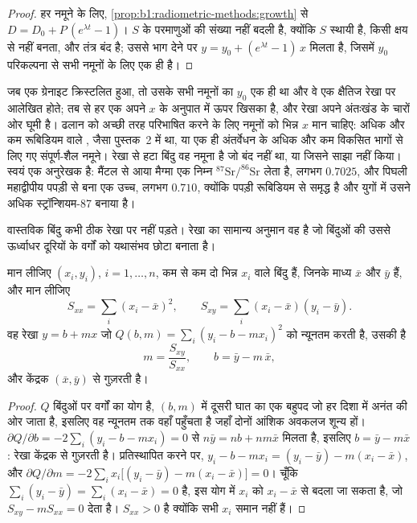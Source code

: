 \begin{proof}
हर नमूने के लिए, \cref{prop:b1:radiometric-methods:growth} से $D = D_0 + P\,(e^{\lambda t} - 1)$। $S$ के परमाणुओं की संख्या नहीं बदली है, क्योंकि $S$ स्थायी है, किसी क्षय से नहीं बनता, और तंत्र बंद है; उससे भाग देने पर $y = y_0 + (e^{\lambda t} - 1)\,x$ मिलता है, जिसमें $y_0$ परिकल्पना से सभी नमूनों के लिए एक ही है।
\end{proof}

जब एक ग्रेनाइट क्रिस्टलित हुआ, तो उसके सभी नमूनों का $y_0$ एक ही था और वे एक क्षैतिज रेखा पर आलेखित होते; तब से हर एक अपने $x$ के अनुपात में ऊपर खिसका है, और रेखा अपने अंतःखंड के चारों ओर घूमी है। ढलान को अच्छी तरह परिभाषित करने के लिए नमूनों को भिन्न $x$ मान चाहिए: अधिक और कम रूबिडियम वाले , जैसा पुस्तक~2 में था, या एक ही अंतर्वेधन के अधिक और कम विकसित भागों से लिए गए संपूर्ण-शैल नमूने। रेखा से हटा बिंदु वह नमूना है जो बंद नहीं था, या जिसने  साझा नहीं किया।  स्वयं एक अनुरेखक है: मैंटल से आया मैग्मा एक निम्न $^{87}\mathrm{Sr}/^{86}\mathrm{Sr}$ लेता है, लगभग $0.7025$, और पिघली महाद्वीपीय पपड़ी से बना एक उच्च, लगभग $0.710$, क्योंकि पपड़ी रूबिडियम से समृद्ध है और युगों में उसने अधिक स्ट्रॉन्शियम-87 बनाया है।

वास्तविक बिंदु कभी ठीक रेखा पर नहीं पड़ते। रेखा का सामान्य अनुमान वह है जो बिंदुओं की उससे ऊर्ध्वाधर दूरियों के वर्गों को यथासंभव छोटा बनाता है।

\begin{proposition}[न्यूनतम-वर्ग रेखा]\label{prop:b1:radiometric-methods:lsq}
मान लीजिए $(x_i, y_i)$, $i = 1, \dots, n$, कम से कम दो भिन्न $x_i$ वाले बिंदु हैं, जिनके माध्य $\bar x$ और $\bar y$ हैं, और मान लीजिए
\[
  S_{xx} = \sum_i (x_i - \bar x)^2, \qquad S_{xy} = \sum_i (x_i - \bar x)(y_i - \bar y).
\]
वह रेखा $y = b + m x$ जो $Q(b, m) = \sum_i (y_i - b - m x_i)^2$ को न्यूनतम करती है, उसकी है
\[
  m = \frac{S_{xy}}{S_{xx}}, \qquad b = \bar y - m\,\bar x ,
\]
और केंद्रक $(\bar x, \bar y)$ से गुज़रती है।
\end{proposition}

\begin{proof}
$Q$ बिंदुओं पर वर्गों का योग है, $(b, m)$ में दूसरी घात का एक बहुपद जो हर दिशा में अनंत की ओर जाता है, इसलिए वह न्यूनतम तक वहाँ पहुँचता है जहाँ दोनों आंशिक अवकलज शून्य हों। $\partial Q/\partial b = -2 \sum_i (y_i - b - m x_i) = 0$ से $n\bar y = n b + n m \bar x$ मिलता है, इसलिए $b = \bar y - m \bar x$: रेखा केंद्रक से गुज़रती है। प्रतिस्थापित करने पर, $y_i - b - m x_i = (y_i - \bar y) - m(x_i -
\bar x)$, और $\partial Q/\partial m = -2 \sum_i x_i \bigl[(y_i - \bar y) - m(x_i
- \bar x)\bigr] = 0$। चूँकि $\sum_i (y_i - \bar y) = \sum_i (x_i - \bar x) = 0$ है, इस योग में $x_i$ को $x_i - \bar x$ से बदला जा सकता है, जो $S_{xy} - m S_{xx} = 0$ देता है। $S_{xx} > 0$ है क्योंकि सभी $x_i$ समान नहीं हैं।
\end{proof}

